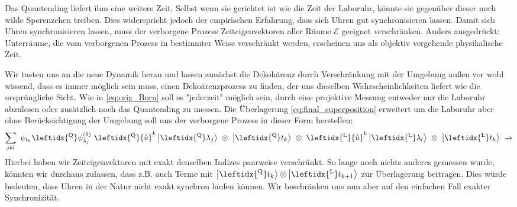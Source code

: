\documentclass[12pt]{article}
\begin{document}
Das Quantending liefert ihm eine weitere Zeit. Selbst wenn sie gerichtet ist wie die Zeit der Laboruhr, könnte sie gegenüber dieser noch wilde Sperenzchen treiben. Dies widerspricht jedoch der empirischen Erfahrung, dass sich Uhren gut synchronisieren lassen. Damit sich Uhren synchronisieren lassen, muss der verborgene Prozess Zeiteigenvektoren aller Räume $\mathscr{E}$ geeignet verschränken. Anders ausgedrückt: Unterräume, die vom verborgenen Prozess in bestimmter Weise verschränkt werden, erscheinen uns als objektiv vergehende physikalische Zeit.

Wir tasten uns an die neue Dynamik heran und lassen zunächst die Dekohärenz durch Verschränkung mit der Umgebung außen vor wohl wissend, dass es immer möglich sein muss, einen Dekoärenzprozess zu finden, der uns dieselben Wahrscheinlichkeiten liefert wie die ursprüngliche Sicht. Wie in \eqref{eq:orig_Born} soll es "jederzeit" möglich sein, durch eine projektive Messung entweder nur die Laboruhr abzulesen oder zusätzlich noch das Quantending zu messen. Die Überlagerung \eqref{eq:final_superposition} erweitert um die Laboruhr aber ohne Berücksichtigung der Umgebung soll uns der verborgene Prozess in dieser Form herstellen:
\begin{equation}
\label{eq:superposition_with_lab}
\sum_{jkl}\ \psi_{t_k} \leftidx{^\mathrm{Q}}\psi_{\lambda_j}^{(0)}\ 
\leftidx{^\mathrm{Q}}{\hat{u}}^k 
\ket{\leftidx{^\mathrm{Q}}\lambda_j} 
\ \otimes\ \ket{\leftidx{^\mathrm{Q}}t_k}
\ \otimes\ \leftidx{^\mathrm{L}}{\hat{u}}^k \ket{ \leftidx{^\mathrm{L}}\lambda_l} 
\ \otimes\ \ket{\leftidx{^\mathrm{L}}t_k}
\ \xrightarrow{}
\end{equation}
Hierbei haben wir Zeiteigenvektoren mit exakt denselben Indizes paarweise verschränkt. So lange noch nichts anderes gemessen wurde, könnten wir durchaus zulassen, dass z.B. auch Terme mit $\ket{\leftidx{^\mathrm{Q}}t_k} \otimes \ket{\leftidx{^\mathrm{L}}t_{k+1}}$ zur Überlagerung beitragen. Dies würde bedeuten, dass Uhren in der Natur nicht exakt synchron laufen können. Wir beschränken uns nun aber auf den einfachen Fall exakter Synchronizität.
\end{document}
